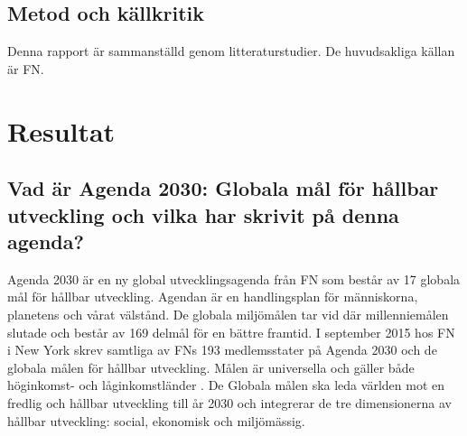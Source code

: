 \documentclass{report}
\begin{document}
\subsection{Metod och källkritik}
Denna rapport är sammanställd genom litteraturstudier. De huvudsakliga källan är FN. 
\newpage 
\section{Resultat}
\subsection{Vad är Agenda 2030: Globala mål för hållbar utveckling och vilka har skrivit på denna agenda?}
Agenda 2030 är en ny global utvecklingsagenda från FN som består av 17 globala mål för hållbar utveckling. \cite{webUNASweden} Agendan\cite{nam2015transforming} är en handlingsplan för människorna, planetens och vårat välstånd. De globala miljömålen tar vid där millenniemålen slutade och består av 169 delmål för en bättre framtid. I september 2015 hos FN i New York skrev samtliga av FNs 193 medlemsstater på Agenda 2030 och de globala målen för hållbar utveckling.\cite{webUNASweden} Målen är universella och gäller både höginkomst- och låginkomstländer \cite{webUNDP}. De Globala målen ska leda världen mot en fredlig och hållbar utveckling till år 2030 och integrerar de tre dimensionerna av hållbar utveckling: social, ekonomisk och miljömässig.  \cite{webUNASweden}\\
\end{document}
